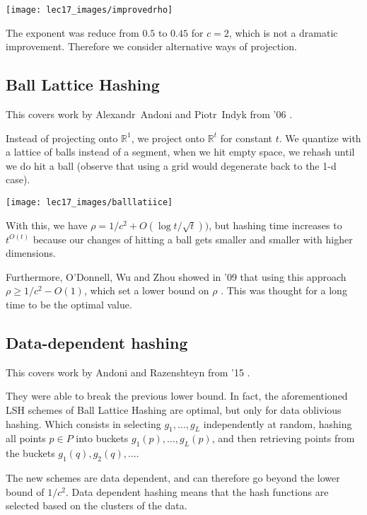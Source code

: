 \documentclass[11pt]{article}
\begin{document}
\begin{center}
    \texttt{[image: lec17\_images/improvedrho]}
\end{center}

The exponent was reduce from $0.5$ to $0.45$ for $c = 2$, which is not a dramatic improvement. Therefore we consider alternative ways of projection.


\subsection{Ball Lattice Hashing}

This covers work by Alexandr~Andoni and Piotr~Indyk from '06 \cite{ai06}.

Instead of projecting onto $\mathbb{R}^1$, we project onto $\mathbb{R}^t$ for constant $t$. We quantize with a lattice of balls instead of a segment, when we hit empty space, we rehash until we do hit a ball (observe that using a grid would degenerate back to the 1-d case).

\begin{center}
    \texttt{[image: lec17\_images/balllatiice]}
\end{center}


With this, we have $\rho = 1/c^2 + O(\log t/\sqrt{t}))$, but hashing time increases to $t^{O(t)}$ because our changes of hitting a ball gets smaller and smaller with higher dimensions.

Furthermore, O’Donnell, Wu and Zhou showed in '09 that using this approach $\rho \geq 1/c^2 - O(1)$, which set a lower bound on $\rho$ \cite{owz09}. This was thought for a long time to be the optimal value.

\subsection{Data-dependent hashing}

This covers work by Andoni and Razenshteyn from '15 \cite{ar15}. 

They were able to break the previous lower bound. In fact, the aforementioned LSH schemes of Ball Lattice Hashing are optimal, but only  for data oblivious hashing. Which consists in selecting $g_1,\ldots, g_L$ independently at random, hashing all points $p\in P$ into buckets $g_1(p),\ldots, g_L(p)$, and then retrieving points from the buckets $g_1(q), g_2(q), \ldots$.

The new schemes are data dependent, and can therefore go beyond the lower bound of $1/c^2$. Data dependent hashing means that the hash functions are selected based on the clusters of the data.  
\end{document}
